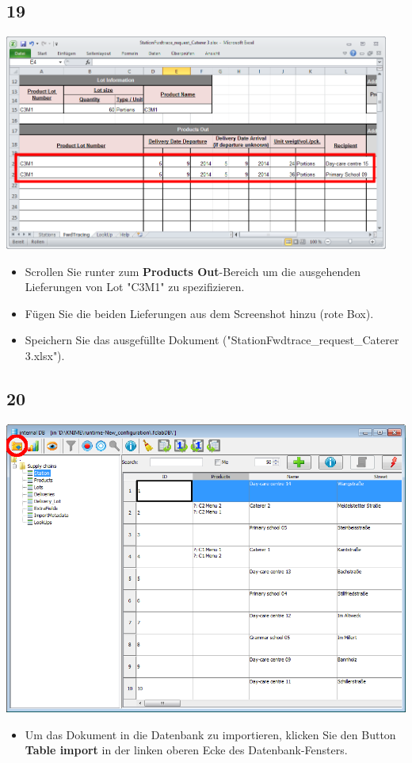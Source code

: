 \documentclass{beamer}
\begin{document}
\subsection{19}
\begin{frame}
	\begin{center}
  		\includegraphics[width=0.95\textwidth]{19.png}
	\end{center}
	\begin{itemize}
		\item Scrollen Sie runter zum \textbf{Products Out}-Bereich um die ausgehenden Lieferungen von Lot "C3M1" zu spezifizieren.
		\item Fügen Sie die beiden Lieferungen aus dem Screenshot hinzu (rote Box).
		\item Speichern Sie das ausgefüllte Dokument ("StationFwdtrace\_request\_Caterer 3.xlsx").
	\end{itemize}
\end{frame}

\subsection{20}
\begin{frame}
	\begin{center}
  		\includegraphics[height=0.6\textheight]{20.png}
	\end{center}
	\begin{itemize}
		\item Um das Dokument in die Datenbank zu importieren, klicken Sie den Button \textbf{Table import} in der linken oberen Ecke des Datenbank-Fensters.
	\end{itemize}
\end{frame}
\end{document}
